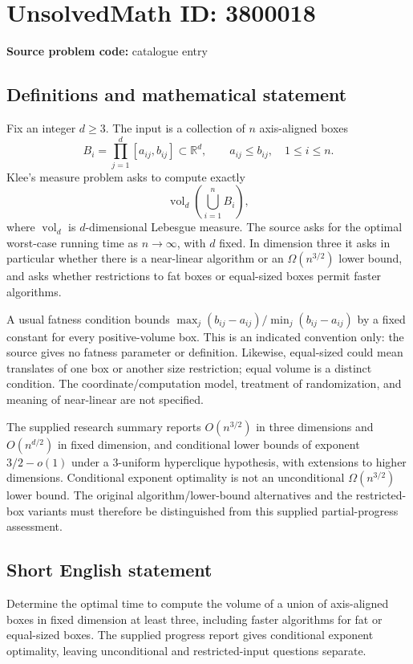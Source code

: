\documentclass[11pt]{article}
\newcommand{\R}{\mathbb{R}}
\begin{document}
\section*{UnsolvedMath ID: 3800018}
\textbf{Source problem code:} catalogue entry
\subsection{Definitions and mathematical statement}
Fix an integer $d\geq3$. The input is a collection of $n$ axis-aligned boxes
\[
B_i=\prod_{j=1}^d[a_{ij},b_{ij}]\subset\R^d,\qquad a_{ij}\leq b_{ij},\quad 1\leq i\leq n.
\]
Klee's measure problem asks to compute exactly
\[
\operatorname{vol}_d\left(\bigcup_{i=1}^n B_i\right),
\]
where $\operatorname{vol}_d$ is $d$-dimensional Lebesgue measure. The source asks for the optimal worst-case running time as $n\to\infty$, with $d$ fixed. In dimension three it asks in particular whether there is a near-linear algorithm or an $\Omega(n^{3/2})$ lower bound, and asks whether restrictions to fat boxes or equal-sized boxes permit faster algorithms.

A usual fatness condition bounds $\max_j(b_{ij}-a_{ij})/\min_j(b_{ij}-a_{ij})$ by a fixed constant for every positive-volume box. This is an indicated convention only: the source gives no fatness parameter or definition. Likewise, equal-sized could mean translates of one box or another size restriction; equal volume is a distinct condition. The coordinate/computation model, treatment of randomization, and meaning of near-linear are not specified.

The supplied research summary reports $O(n^{3/2})$ in three dimensions and $O(n^{d/2})$ in fixed dimension, and conditional lower bounds of exponent $3/2-o(1)$ under a 3-uniform hyperclique hypothesis, with extensions to higher dimensions. Conditional exponent optimality is not an unconditional $\Omega(n^{3/2})$ lower bound. The original algorithm/lower-bound alternatives and the restricted-box variants must therefore be distinguished from this supplied partial-progress assessment.
\subsection{Short English statement}
Determine the optimal time to compute the volume of a union of axis-aligned boxes in fixed dimension at least three, including faster algorithms for fat or equal-sized boxes. The supplied progress report gives conditional exponent optimality, leaving unconditional and restricted-input questions separate.
\end{document}
